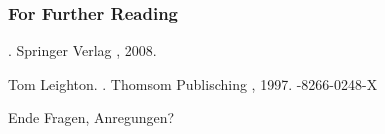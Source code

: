 \documentclass[ucs,9pt]{beamer}
\begin{document}
\begin{frame}[allowframebreaks]
  \frametitle<presentation>{For Further Reading}
    
  \begin{thebibliography}{10}
    
  \beamertemplatebookbibitems

  \bibitem{}
    .
    \newblock Springer Verlag , 2008.
    
    Tom Leighton.
    .
    \newblock Thomsom Publisching , 1997.
    -8266-0248-X
 
    
  \beamertemplatearticlebibitems

    
  \end{thebibliography}
\end{frame}

\begin{frame}{Ende}
    Fragen, Anregungen?\\
\end{frame}
\end{document}
